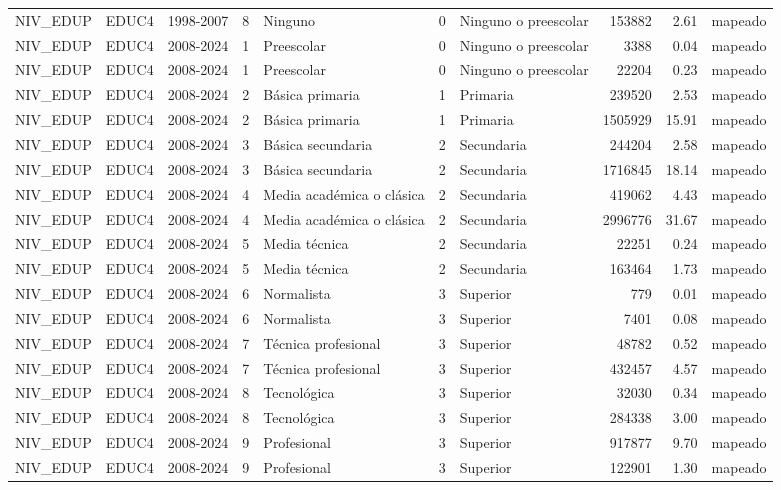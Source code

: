 \begin{tabular}{lllrlllrrl}
NIV\_EDUP & EDUC4 & 1998-2007 & 8 & Ninguno & 0 & Ninguno o preescolar & 153882 & 2.61 & mapeado \\
NIV\_EDUP & EDUC4 & 2008-2024 & 1 & Preescolar & 0 & Ninguno o preescolar & 3388 & 0.04 & mapeado \\
NIV\_EDUP & EDUC4 & 2008-2024 & 1 & Preescolar & 0 & Ninguno o preescolar & 22204 & 0.23 & mapeado \\
NIV\_EDUP & EDUC4 & 2008-2024 & 2 & Básica primaria & 1 & Primaria & 239520 & 2.53 & mapeado \\
NIV\_EDUP & EDUC4 & 2008-2024 & 2 & Básica primaria & 1 & Primaria & 1505929 & 15.91 & mapeado \\
NIV\_EDUP & EDUC4 & 2008-2024 & 3 & Básica secundaria & 2 & Secundaria & 244204 & 2.58 & mapeado \\
NIV\_EDUP & EDUC4 & 2008-2024 & 3 & Básica secundaria & 2 & Secundaria & 1716845 & 18.14 & mapeado \\
NIV\_EDUP & EDUC4 & 2008-2024 & 4 & Media académica o clásica & 2 & Secundaria & 419062 & 4.43 & mapeado \\
NIV\_EDUP & EDUC4 & 2008-2024 & 4 & Media académica o clásica & 2 & Secundaria & 2996776 & 31.67 & mapeado \\
NIV\_EDUP & EDUC4 & 2008-2024 & 5 & Media técnica & 2 & Secundaria & 22251 & 0.24 & mapeado \\
NIV\_EDUP & EDUC4 & 2008-2024 & 5 & Media técnica & 2 & Secundaria & 163464 & 1.73 & mapeado \\
NIV\_EDUP & EDUC4 & 2008-2024 & 6 & Normalista & 3 & Superior & 779 & 0.01 & mapeado \\
NIV\_EDUP & EDUC4 & 2008-2024 & 6 & Normalista & 3 & Superior & 7401 & 0.08 & mapeado \\
NIV\_EDUP & EDUC4 & 2008-2024 & 7 & Técnica profesional & 3 & Superior & 48782 & 0.52 & mapeado \\
NIV\_EDUP & EDUC4 & 2008-2024 & 7 & Técnica profesional & 3 & Superior & 432457 & 4.57 & mapeado \\
NIV\_EDUP & EDUC4 & 2008-2024 & 8 & Tecnológica & 3 & Superior & 32030 & 0.34 & mapeado \\
NIV\_EDUP & EDUC4 & 2008-2024 & 8 & Tecnológica & 3 & Superior & 284338 & 3.00 & mapeado \\
NIV\_EDUP & EDUC4 & 2008-2024 & 9 & Profesional & 3 & Superior & 917877 & 9.70 & mapeado \\
NIV\_EDUP & EDUC4 & 2008-2024 & 9 & Profesional & 3 & Superior & 122901 & 1.30 & mapeado \\

\end{tabular}
